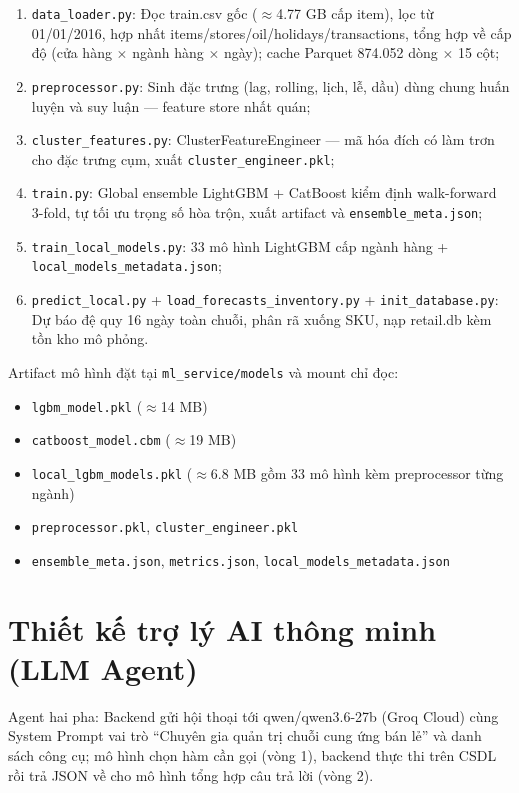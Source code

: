 \documentclass[12pt,a4paper]{report}
\begin{document}
\begin{enumerate}
    \item \texttt{data\_loader.py}: Đọc train.csv gốc ($\approx$4.77 GB cấp item), lọc từ 01/01/2016, hợp nhất items/stores/oil/holidays/transactions, tổng hợp về cấp độ (cửa hàng $\times$ ngành hàng $\times$ ngày); cache Parquet 874.052 dòng $\times$ 15 cột;
    
    \item \texttt{preprocessor.py}: Sinh đặc trưng (lag, rolling, lịch, lễ, dầu) dùng chung huấn luyện và suy luận --- feature store nhất quán;
    
    \item \texttt{cluster\_features.py}: ClusterFeatureEngineer --- mã hóa đích có làm trơn cho đặc trưng cụm, xuất \texttt{cluster\_engineer.pkl};
    
    \item \texttt{train.py}: Global ensemble LightGBM + CatBoost kiểm định walk-forward 3-fold, tự tối ưu trọng số hòa trộn, xuất artifact và \texttt{ensemble\_meta.json};
    
    \item \texttt{train\_local\_models.py}: 33 mô hình LightGBM cấp ngành hàng + \texttt{local\_models\_metadata.json};
    
    \item \texttt{predict\_local.py} + \texttt{load\_forecasts\_inventory.py} + \texttt{init\_database.py}: Dự báo đệ quy 16 ngày toàn chuỗi, phân rã xuống SKU, nạp retail.db kèm tồn kho mô phỏng.
\end{enumerate}

Artifact mô hình đặt tại \texttt{ml\_service/models} và mount chỉ đọc:
\begin{itemize}
    \item \texttt{lgbm\_model.pkl} ($\approx$14 MB)
    \item \texttt{catboost\_model.cbm} ($\approx$19 MB)
    \item \texttt{local\_lgbm\_models.pkl} ($\approx$6.8 MB gồm 33 mô hình kèm preprocessor từng ngành)
    \item \texttt{preprocessor.pkl}, \texttt{cluster\_engineer.pkl}
    \item \texttt{ensemble\_meta.json}, \texttt{metrics.json}, \texttt{local\_models\_metadata.json}
\end{itemize}


\section{Thiết kế trợ lý AI thông minh (LLM Agent)}
Agent hai pha: Backend gửi hội thoại tới qwen/qwen3.6-27b (Groq Cloud) cùng System Prompt vai trò ``Chuyên gia quản trị chuỗi cung ứng bán lẻ'' và danh sách công cụ; mô hình chọn hàm cần gọi (vòng 1), backend thực thi trên CSDL rồi trả JSON về cho mô hình tổng hợp câu trả lời (vòng 2).
\end{document}
